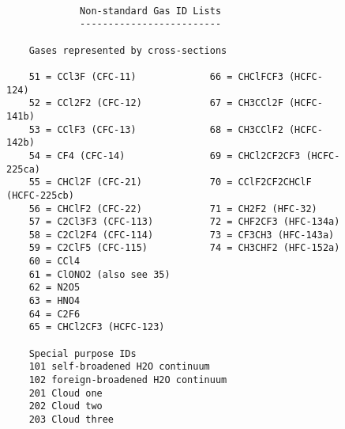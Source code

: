 \documentclass[12pt]{article}
\begin{document}
\begin{figure}
{\small
\begin{verbatim}

             Non-standard Gas ID Lists
             -------------------------

    Gases represented by cross-sections
 
    51 = CCl3F (CFC-11)             66 = CHClFCF3 (HCFC-124)
    52 = CCl2F2 (CFC-12)            67 = CH3CCl2F (HCFC-141b)
    53 = CClF3 (CFC-13)             68 = CH3CClF2 (HCFC-142b)
    54 = CF4 (CFC-14)               69 = CHCl2CF2CF3 (HCFC-225ca)
    55 = CHCl2F (CFC-21)            70 = CClF2CF2CHClF (HCFC-225cb)
    56 = CHClF2 (CFC-22)            71 = CH2F2 (HFC-32)
    57 = C2Cl3F3 (CFC-113)          72 = CHF2CF3 (HFC-134a)
    58 = C2Cl2F4 (CFC-114)          73 = CF3CH3 (HFC-143a)
    59 = C2ClF5 (CFC-115)           74 = CH3CHF2 (HFC-152a)
    60 = CCl4
    61 = ClONO2 (also see 35)
    62 = N2O5
    63 = HNO4
    64 = C2F6
    65 = CHCl2CF3 (HCFC-123)

    Special purpose IDs
    101 self-broadened H2O continuum
    102 foreign-broadened H2O continuum
    201 Cloud one
    202 Cloud two
    203 Cloud three

\end{verbatim}
}
\end{figure}
\end{document}
